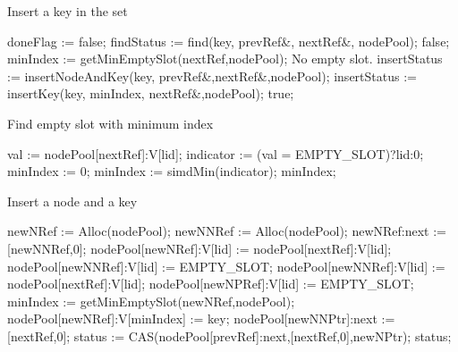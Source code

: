 \documentclass[11pt,onecolumn]{IEEEtran}
\begin{document}
\begin{algorithm}
  \caption{Insert a key in the set}
  \label{alg:insert}
  \begin{algorithmic}[5]  
      \State doneFlag := false;
        \State findStatus := find(key, prevRef\&, nextRef\&, nodePool);
          \State
          \Return false;
        \EndIf
        \State minIndex := getMinEmptySlot(nextRef,nodePool);
         \Comment No empty slot.
          \State insertStatus := insertNodeAndKey(key, prevRef\&,nextRef\&,nodePool);
        \Else
          \State insertStatus := insertKey(key, minIndex, nextRef\&,nodePool);
        \EndIf
          \State
          \Return true;
        \EndIf
      \EndWhile
    \EndFunction
  \end{algorithmic}
\end{algorithm}

\begin{algorithm}
  \caption{Find empty slot with minimum index}
  \label{alg:minindex}
  \begin{algorithmic}[5]  
      \State val := nodePool[nextRef]:V[lid];
      \State indicator := (val = EMPTY\_SLOT)?lid:0;
        \State minIndex := 0;
      \Else
        \State minIndex := simdMin(indicator);
      \EndIf
      \Return minIndex;        
    \EndFunction
  \end{algorithmic}
\end{algorithm}

\begin{algorithm}
  \caption{Insert a node and a key}
  \label{alg:insnodekey}
  \begin{algorithmic}[5]  
      \State newNRef := Alloc(nodePool);
      \State newNNRef := Alloc(nodePool);
      \State newNRef:next := [newNNRef,0];
        \State nodePool[newNRef]:V[lid] := nodePool[nextRef]:V[lid];
        \State nodePool[newNNRef]:V[lid] := EMPTY\_SLOT;
      \Else
        \State nodePool[newNNRef]:V[lid] := nodePool[nextRef]:V[lid];
        \State nodePool[newNPRef]:V[lid] := EMPTY\_SLOT;
      \EndIf
      \State minIndex := getMinEmptySlot(newNRef,nodePool);
      \State nodePool[newNRef]:V[minIndex] := key;
      \State nodePool[newNNPtr]:next := [nextRef,0];
      \State status := CAS(nodePool[prevRef]:next,[nextRef,0],newNPtr);
      \Return status;
    \EndFunction
  \end{algorithmic}
\end{algorithm}
\end{document}
